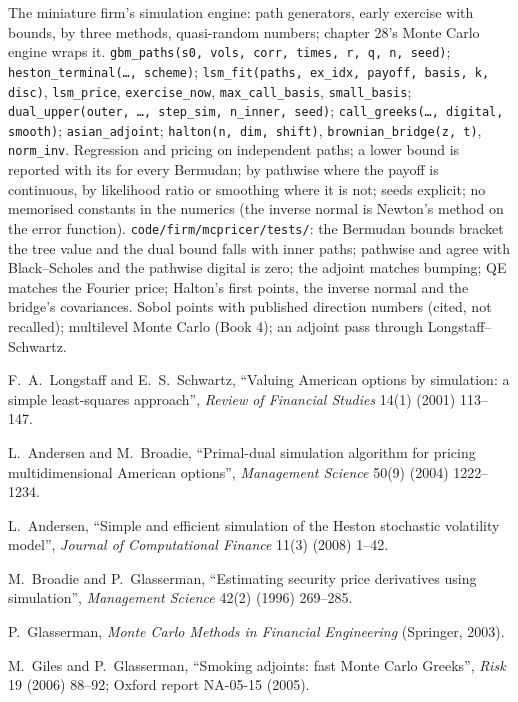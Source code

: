 \begin{build}
 The miniature firm's simulation engine: path generators, early exercise with bounds,  by three methods, quasi-random numbers;
chapter 28's Monte Carlo engine wraps it.
 \texttt{gbm\_paths(s0, vols, corr, times, r, q, n, seed)}; \texttt{heston\_terminal(\ldots, scheme)}; \texttt{lsm\_fit(paths, ex\_idx, payoff,
basis, k, disc)}, \texttt{lsm\_price}, \texttt{exercise\_now}, \texttt{max\_call\_basis}, \texttt{small\_basis}; \texttt{dual\_upper(outer, \ldots, step\_sim,
n\_inner, seed)}; \texttt{call\_greeks(\ldots, digital, smooth)}; \texttt{asian\_adjoint}; \texttt{halton(n, dim, shift)}, \texttt{brownian\_bridge(z, t)},
\texttt{norm\_inv}.
 Regression and pricing on independent paths; a lower bound is reported with its  for every Bermudan;  by pathwise where
the payoff is continuous, by likelihood ratio or smoothing where it is not; seeds explicit; no memorised constants in the numerics (the inverse normal is
Newton's method on the error function).
 \texttt{code/firm/mcpricer/tests/}: the Bermudan bounds bracket the tree value and the dual bound falls with inner paths; pathwise and
 agree with Black--Scholes and the pathwise digital is zero; the adjoint matches bumping; QE matches the Fourier price; Halton's first
points, the inverse normal and the bridge's covariances.
 Sobol points with published direction numbers (cited, not recalled); multilevel Monte Carlo (Book 4); an adjoint pass through
Longstaff--Schwartz.
\end{build}

\begin{omsources}
\item F.~A.~Longstaff and E.~S.~Schwartz, ``Valuing American options by simulation: a simple least-squares approach'', \emph{Review of Financial Studies}
14(1) (2001) 113--147.
\item L.~Andersen and M.~Broadie, ``Primal-dual simulation algorithm for pricing multidimensional American options'', \emph{Management Science} 50(9)
(2004) 1222--1234.
\item L.~Andersen, ``Simple and efficient simulation of the Heston stochastic volatility model'', \emph{Journal of Computational Finance} 11(3) (2008) 1--42.
\item M.~Broadie and P.~Glasserman, ``Estimating security price derivatives using simulation'', \emph{Management Science} 42(2) (1996) 269--285.
\item P.~Glasserman, \emph{Monte Carlo Methods in Financial Engineering} (Springer, 2003).
\item M.~Giles and P.~Glasserman, ``Smoking adjoints: fast Monte Carlo Greeks'', \emph{Risk} 19 (2006) 88--92; Oxford report NA-05-15 (2005).
\end{omsources}

